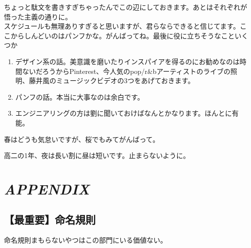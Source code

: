 \documentclass[a4paper]{ltjsreport}
\newcommand{\Chapter}[1]{\chapter{#1}\thispagestyle{fancy}}
\begin{document}
ちょっと駄文を書きすぎちゃったんでこの辺にしておきます。あとはそれぞれが悟った主義の通りに。
\\

スケジュールも無理ありすぎると思いますが、君らならできると信じてます。ここからしんどいのはパンフかな。がんばってね。最後に役に立ちそうなこといくつか
\begin{enumerate}
  \item デザイン系の話。美意識を磨いたりインスパイアを得るのにお勧めなのは時間ないだろうからPinterest、今人気のpop/r\&bアーティストのライブの照明、藤井風のミュージックビデオの3つをあげておきます。
  \item パンフの話。本当に大事なのは余白です。
  \item エンジニアリングの方は劉に聞いておけばなんとかなります。ほんとに有能。
\end{enumerate}


春はどうも気怠いですが、桜でもみてがんばって。

高二の1年、夜は長い割に昼は短いです。止まらないように。

\Chapter{\textit{APPENDIX}}
\section{【最重要】命名規則}\label{sec:命名規則}
命名規則まもらないやつはこの部門にいる価値ない。
\end{document}

